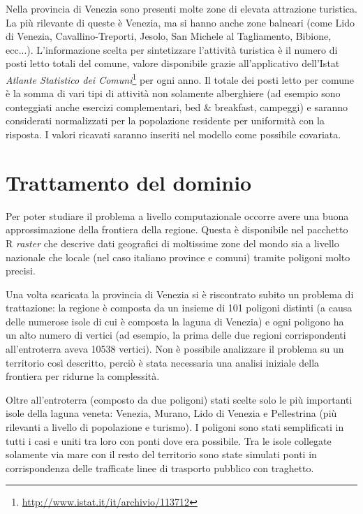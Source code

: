 \documentclass[a4paper,11pt,twoside,openright]{book}							%
\begin{document}
Nella provincia di Venezia sono presenti molte zone di elevata attrazione turistica. La più rilevante di queste è Venezia, ma si hanno anche zone balneari (come Lido di Venezia, Cavallino-Treporti, Jesolo, San Michele al Tagliamento, Bibione, ecc...). L'informazione scelta per sintetizzare l'attività turistica è il numero di posti letto totali del comune, valore disponibile grazie all'applicativo dell'Istat \textit{Atlante Statistico dei Comuni}\footnote{\href{http://www.istat.it/it/archivio/113712}{http://www.istat.it/it/archivio/113712}} per ogni anno. Il totale dei posti letto per comune è la somma di vari tipi di attività non solamente alberghiere (ad esempio sono conteggiati anche esercizi complementari, bed \& breakfast, campeggi) e saranno considerati normalizzati per la popolazione residente per uniformità con la risposta. I valori ricavati saranno inseriti nel modello come possibile covariata.


\section{Trattamento del dominio}

Per poter studiare il problema a livello computazionale occorre avere una buona approssimazione della frontiera della regione. Questa è disponibile nel pacchetto R \textit{raster} che descrive dati geografici di moltissime zone del mondo sia a livello nazionale che locale (nel caso italiano province e comuni) tramite poligoni molto precisi.

Una volta scaricata la provincia di Venezia si è riscontrato subito un problema di trattazione: la regione è composta da un insieme di 101 poligoni distinti (a causa delle numerose isole di cui è composta la laguna di Venezia) e ogni poligono ha un alto numero di vertici (ad esempio, la prima delle due regioni corrispondenti all'entroterra aveva 10538 vertici). Non è possibile analizzare il problema su un territorio così descritto, perciò è stata necessaria una analisi iniziale della frontiera per ridurne la complessità.

Oltre all'entroterra (composto da due poligoni) stati scelte solo le più importanti isole della laguna veneta: Venezia, Murano, Lido di Venezia e Pellestrina (più rilevanti a livello di popolazione e turismo). I poligoni sono stati semplificati in tutti i casi e uniti tra loro con ponti dove era possibile. Tra le isole collegate solamente via mare con il resto del territorio sono state simulati ponti in corrispondenza delle trafficate linee di trasporto pubblico con traghetto.
\end{document}
